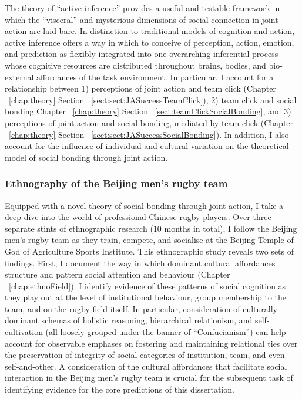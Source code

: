 The theory of ``active inference'' \citep{Friston2010} provides a useful and testable framework in which the ``visceral'' and mysterious dimensions of social connection in joint action are laid bare.  In distinction to traditional models of cognition and action, active inference offers a way in which to conceive of perception, action, emotion, and prediction as flexibly integrated into one overarching inferential process whose cognitive resources are distributed throughout brains, bodies, and bio-external affordances of the task environment.  In particular, I account for a relationship between 1) perceptions of joint action and team click (Chapter ~\ref{chap:theory} Section ~\ref{sect:sect:JASuccessTeamClick}), 2) team click and social bonding Chapter ~\ref{chap:theory} Section ~\ref{sect:teamClickSocialBonding}, and 3) perceptions of joint action and social bonding, mediated by team click (Chapter ~\ref{chap:theory} Section ~\ref{sect:sect:JASuccessSocialBonding}).  In addition, I also account for the influence of individual and cultural variation on the theoretical model of social bonding through joint action.

\subsubsection{Ethnography of the Beijing men's rugby team}
Equipped with a novel theory of social bonding through joint action, I take a deep dive into the world of professional Chinese rugby players. Over three separate stints of ethnographic research (10 months in total), I follow the Beijing men's rugby team as they train, compete, and socialise at the Beijing Temple of God of Agriculture Sports Institute.  This ethnographic study reveals two sets of findings.  First, I document the way in which dominant cultural affordances structure and pattern social attention and behaviour  (Chapter ~\ref{chap:ethnoField}).  I identify evidence of these patterns of social cognition as they play out at the level of institutional behaviour, group membership to the team, and on the rugby field itself.  In particular, consideration of culturally dominant schemas of holistic reasoning, hierarchical relationism, and self-cultivation (all loosely grouped under the banner of ``Confucianism'') can help account for observable emphases on fostering and maintaining relational ties over the preservation of integrity of social categories of institution, team, and even self-and-other.  A consideration of the cultural affordances that facilitate social interaction in the Beijing men's rugby team is crucial for the subsequent task of identifying evidence for the core predictions of this dissertation.


